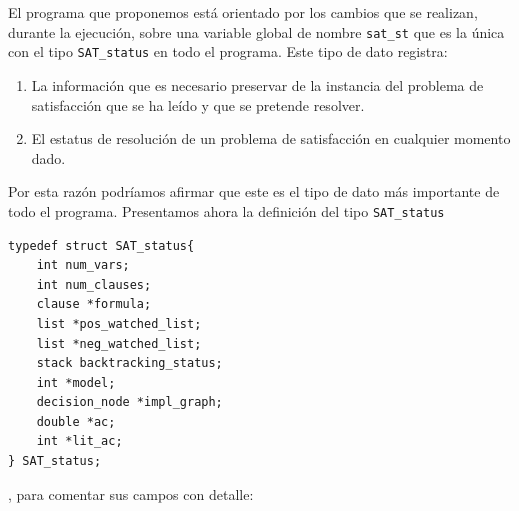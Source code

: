 \documentclass[12pt,lettersize,oneside]{article}
\begin{document}
El programa que proponemos está orientado por los cambios que se realizan,
durante la ejecución, sobre una variable global de nombre {\tt sat\_st} que es la
única con el tipo {\tt SAT\_status} en todo el programa. 
Este tipo de dato registra: \vspace{-4.5mm}
\begin{enumerate}
\item La información que es necesario preservar de la instancia del problema de
  satisfacción que se ha leído y que se pretende resolver.
\item El estatus de resolución de un problema de satisfacción en cualquier
  momento dado.
\end{enumerate}
Por esta razón podríamos afirmar que este es el tipo de dato más importante de
todo el programa.
Presentamos ahora la definición del tipo {\tt SAT\_status}
\begin{lstlisting}
typedef struct SAT_status{    
    int num_vars;
    int num_clauses;
    clause *formula;
    list *pos_watched_list;
    list *neg_watched_list;
    stack backtracking_status;
    int *model;
    decision_node *impl_graph;
    double *ac;
    int *lit_ac;                     
} SAT_status;
\end{lstlisting}
, para comentar sus campos con detalle:\vspace{-2.5mm}
\end{document}
